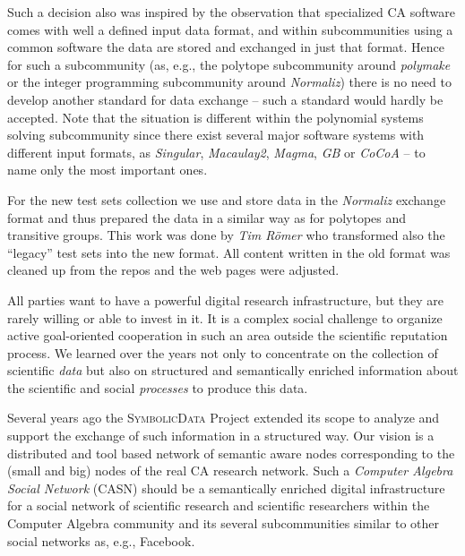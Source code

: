 \documentclass[a4paper,11pt]{article}
\def\SD{\textsc{Symbolic\-Data}}
\begin{document}
\begin{multicols}{2}
Such a decision also was inspired by the observation that specialized CA
software comes with well a defined input data format, and within subcommunities
using a common software the data are stored and exchanged in just that format.
Hence for such a subcommunity (as, e.g., the polytope subcommunity around
\emph{polymake} or the integer programming subcommunity around \emph{Normaliz})
there is no need to develop another standard for data exchange -- such a
standard would hardly be accepted.  Note that the situation is different within
the polynomial systems solving subcommunity since there exist several major
software systems with different input formats, as \emph{Singular},
\emph{Macaulay2}, \emph{Magma}, \emph{GB} or \emph{CoCoA} -- to name only the
most important ones.

For the new test sets collection we use and store data in the \emph{Normaliz}
exchange format and thus prepared the data in a similar way as for polytopes
and transitive groups. This work was done by \emph{Tim R\"omer} who transformed
also the ``legacy'' test sets into the new format.  All content written in the
old format was cleaned up from the repos and the web pages were adjusted.



All parties want to have a powerful digital research infrastructure, but they
are rarely willing or able to invest in it.  It is a complex social challenge
to organize active goal-oriented cooperation in such an area outside the
scientific reputation process. We learned over the years not only to
concentrate on the collection of scientific \emph{data} but also on structured
and semantically enriched information about the scientific and social
\emph{processes} to produce this data.

Several years ago the {\SD} Project extended its scope to analyze and support
the exchange of such information in a structured way.  Our vision is a
distributed and tool based network of semantic aware nodes corresponding to
the (small and big) nodes of the real CA research network.  Such a
\emph{Computer Algebra Social Network} (CASN) should be a semantically
enriched digital infrastructure for a social network of scientific research
and scientific researchers within the Computer Algebra community and its
several subcommunities similar to other social networks as, e.g., Facebook.


\end{multicols}
\end{document}
